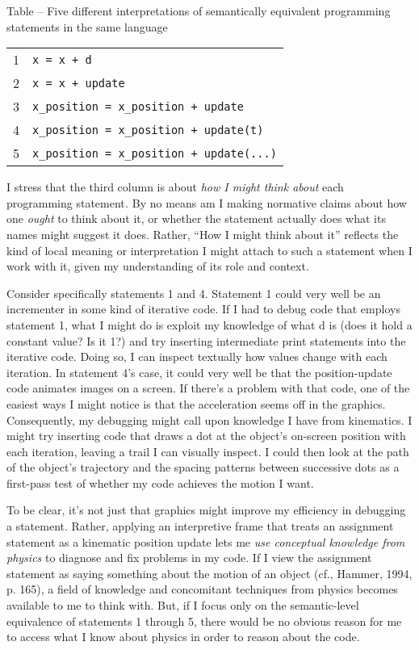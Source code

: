 \protect\hypertarget{ux5fToc252445956}{}{}Table -- Five different
interpretations of semantically equivalent programming statements in the
same language

\begin{center}
  \begin{tabular}{ | l | l |}
    1 & \texttt{x\ =\ x\ +\ d} \\
    2 & \texttt{x\ =\ x\ +\ update} \\
    3 & \texttt{x\_position\ =\ x\_position\ +\ update} \\
    4 & \texttt{x\_position\ =\ x\_position\ +\ update(t)} \\
    5 & \texttt{x\_position\ =\ x\_position\ +\ update(...)} \\
  \end{tabular}
\end{center}


I stress that the third column is about \emph{how I might think about}
each programming statement\emph{.} By no means am I making normative
claims about how one \emph{ought} to think about it, or whether the
statement actually does what its names might suggest it does. Rather,
``How I might think about it'' reflects the kind of local meaning or
interpretation I might attach to such a statement when I work with it,
given my understanding of its role and context.

Consider specifically statements 1 and 4. Statement 1 could very well be
an incrementer in some kind of iterative code. If I had to debug code
that employs statement 1, what I might do is exploit my knowledge of
what d is (does it hold a constant value? Is it 1?) and try inserting
intermediate print statements into the iterative code. Doing so, I can
inspect textually how values change with each iteration. In statement
4's case, it could very well be that the position-update code animates
images on a screen. If there's a problem with that code, one of the
easiest ways I might notice is that the acceleration seems off in the
graphics. Consequently, my debugging might call upon knowledge I have
from kinematics. I might try inserting code that draws a dot at the
object's on-screen position with each iteration, leaving a trail I can
visually inspect. I could then look at the path of the object's
trajectory and the spacing patterns between successive dots as a
first-pass test of whether my code achieves the motion I want.

To be clear, it's not just that graphics might improve my efficiency in
debugging a statement. Rather, applying an interpretive frame that
treats an assignment statement as a kinematic position update lets me
\emph{use conceptual knowledge from physics} to diagnose and fix
problems in my code. If I view the assignment statement as saying
something about the motion of an object (cf., Hammer, 1994, p. 165), a
field of knowledge and concomitant techniques from physics becomes
available to me to think with. But, if I focus only on the
semantic-level equivalence of statements 1 through 5, there would be no
obvious reason for me to access what I know about physics in order to
reason about the code.

